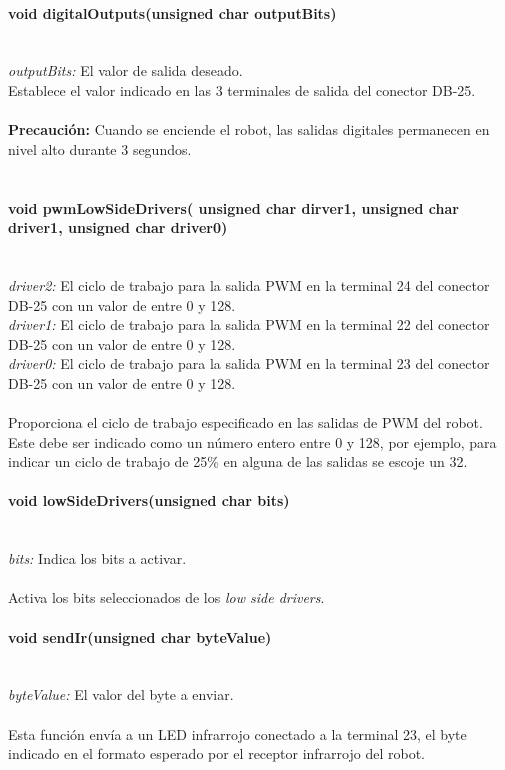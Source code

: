 \documentclass[letterpaper,openright,12pt]{book}
\begin{document}
\paragraph{void digitalOutputs(unsigned char outputBits)}\mbox{}\\
\emph{outputBits: } El valor de salida deseado.\\
Establece el valor indicado en las 3 terminales de salida del conector DB-25.\\\\
\textbf{Precaución: }Cuando se enciende el robot, las salidas digitales permanecen en nivel alto durante 3 segundos.\\\\

\paragraph{	void pwmLowSideDrivers( unsigned char dirver1, unsigned char driver1, unsigned char driver0)}\mbox{}\\
\emph{driver2: } El ciclo de trabajo para la salida PWM en la terminal 24 del conector DB-25 con un valor de entre 0 y 128.\\
\emph{driver1: } El ciclo de trabajo para la salida PWM en la terminal 22 del conector DB-25 con un valor de entre 0 y 128.\\
\emph{driver0: } El ciclo de trabajo para la salida PWM en la terminal 23 del conector DB-25 con un valor de entre 0 y 128.\\\\

Proporciona el ciclo de trabajo especificado en las salidas de PWM del robot. Este debe ser indicado como un número entero entre 0 y 128, por ejemplo, para indicar un ciclo de trabajo de 25\% en alguna de las salidas se escoje un 32.\\

\paragraph{void lowSideDrivers(unsigned char bits)}\mbox{}\\
\emph{bits: } Indica los bits a activar.\\\\
Activa los bits seleccionados de los \emph{low side drivers}.

\paragraph{void sendIr(unsigned char byteValue)}\mbox{}\\
\emph{byteValue: }El valor del byte  a enviar.\\\\
Esta función envía a un LED infrarrojo conectado a la terminal 23, el byte indicado en el formato esperado por el receptor infrarrojo del robot.\\
\end{document}
